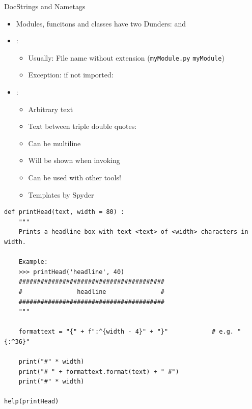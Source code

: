 \begin{frame}[fragile]{DocStrings and Nametags}
%
\begin{itemize}
\item Modules, funcitons and classes have two Dunders:  and 
\item {}:
	\begin{itemize}
	\item Usually: File name without extension (\texttt{myModule.py} \thus \texttt{myModule})
	\item Exception: if not imported: 
	\end{itemize}
\item {}:
	\begin{itemize}
	\item Arbitrary text
	\item Text between triple double quotes: 
	\item Can be multiline
	\item Will be shown when invoking 
	\item Can be used with other tools!
	\item Templates by Spyder
	\end{itemize}
\end{itemize}
%
\end{frame}


\begin{frame}[fragile]
%
\begin{codebox}
\begin{verbatim}
def printHead(text, width = 80) :
    """
    Prints a headline box with text <text> of <width> characters in width.
    
    Example:
    >>> printHead('headline', 40)
    ########################################
    #               headline               #
    ########################################
    """
    
    formattext = "{" + f":^{width - 4}" + "}"            # e.g. "{:^36}"
    
    print("#" * width)
    print("# " + formattext.format(text) + " #")
    print("#" * width)

help(printHead)
\end{verbatim}
\end{codebox}
%
\end{frame}

